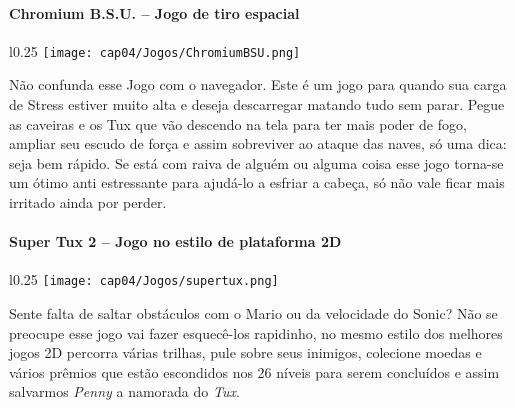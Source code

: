 \paragraph{Chromium B.S.U. – Jogo de tiro espacial}
\begin{minipage}{\linewidth}
 \vspace{5pt}
 \begin{wrapfigure}{l}{0.25\textwidth}
  \vspace{-\baselineskip}
  \texttt{[image: cap04/Jogos/ChromiumBSU.png]} 
 \end{wrapfigure}
 Não confunda esse Jogo com o navegador. Este é um jogo para quando sua carga de Stress estiver muito alta e deseja descarregar matando tudo sem parar. Pegue as caveiras e os Tux que vão descendo na tela para ter mais poder de fogo, ampliar seu escudo de força e assim sobreviver ao ataque das naves, só uma dica: seja bem rápido. Se está com raiva de alguém ou alguma coisa esse jogo torna-se um ótimo anti estressante para ajudá-lo a esfriar a cabeça, só não vale ficar mais irritado ainda por perder.
\end{minipage}

\paragraph{Super Tux 2 – Jogo no estilo de plataforma 2D}
\begin{minipage}{\linewidth}
 \vspace{5pt}
 \begin{wrapfigure}{l}{0.25\textwidth}
  \vspace{-\baselineskip}
  \texttt{[image: cap04/Jogos/supertux.png]} 
 \end{wrapfigure}
 Sente falta de saltar obstáculos com o Mario ou da velocidade do Sonic? Não se preocupe esse jogo vai fazer esquecê-los rapidinho, no mesmo estilo dos melhores jogos 2D percorra várias trilhas, pule sobre seus inimigos, colecione moedas e vários prêmios que estão escondidos nos 26 níveis para serem concluídos e assim salvarmos \textit{Penny} a namorada do \textit{Tux}.
\end{minipage}

